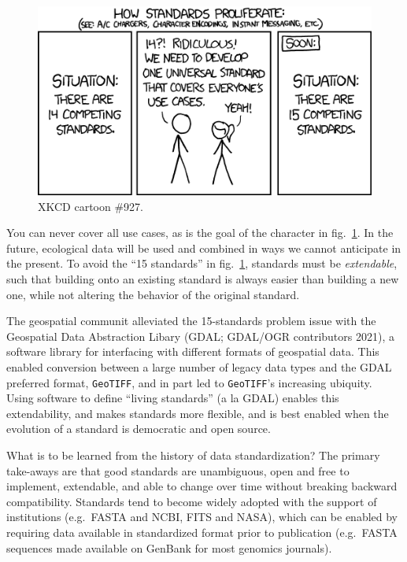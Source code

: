 \documentclass[10pt,oneside]{article}
\makeatletter
\def\maxwidth{\ifdim\Gin@nat@width>\linewidth\linewidth
\else\Gin@nat@width\fi}
\let\Oldincludegraphics\includegraphics
\renewcommand{\includegraphics}[1]{\Oldincludegraphics[width=\maxwidth]{#1}}
\makeatother
\begin{document}
\begin{figure}
\hypertarget{fig:xkcd}{%
\centering
\includegraphics{./figures/xkcdstandards.png}
\caption{XKCD cartoon \#927.}\label{fig:xkcd}
}
\end{figure}

You can never cover all use cases, as is the goal of the character in
fig.~\ref{fig:xkcd}. In the future, ecological data will be used and
combined in ways we cannot anticipate in the present. To avoid the ``15
standards'' in fig.~\ref{fig:xkcd}, standards must be \emph{extendable},
such that building onto an existing standard is always easier than
building a new one, while not altering the behavior of the original
standard.

The geospatial communit alleviated the 15-standards problem issue with
the Geospatial Data Abstraction Libary (GDAL; GDAL/OGR contributors
2021), a software library for interfacing with different formats of
geospatial data. This enabled conversion between a large number of
legacy data types and the GDAL preferred format, \texttt{GeoTIFF}, and
in part led to \texttt{GeoTIFF}'s increasing ubiquity. Using software to
define ``living standards'' (a la GDAL) enables this extendability, and
makes standards more flexible, and is best enabled when the evolution of
a standard is democratic and open source.

What is to be learned from the history of data standardization? The
primary take-aways are that good standards are unambiguous, open and
free to implement, extendable, and able to change over time without
breaking backward compatibility. Standards tend to become widely adopted
with the support of institutions (e.g.~FASTA and NCBI, FITS and NASA),
which can be enabled by requiring data available in standardized format
prior to publication (e.g.~FASTA sequences made available on GenBank for
most genomics journals).
\end{document}
